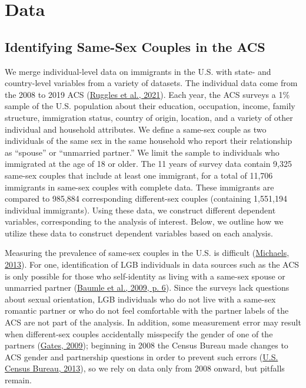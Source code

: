 \documentclass[
  11pt,
]{article}
\begin{document}
\hypertarget{data}{%
\section{Data}\label{data}}

\hypertarget{identifying-same-sex-couples-in-the-acs}{%
\subsection{Identifying Same-Sex Couples in the ACS}\label{identifying-same-sex-couples-in-the-acs}}

We merge individual-level data on immigrants in the U.S. with state- and country-level variables from a variety of datasets. The individual data come from the 2008 to 2019 ACS (\protect\hyperlink{ref-ruggles_2021}{Ruggles et al., 2021}). Each year, the ACS surveys a 1\% sample of the U.S. population about their education, occupation, income, family structure, immigration status, country of origin, location, and a variety of other individual and household attributes. We define a same-sex couple as two individuals of the same sex in the same household who report their relationship as ``spouse'' or ``unmarried partner.'' We limit the sample to individuals who immigrated at the age of 18 or older. The 11 years of survey data contain 9,325 same-sex couples that include at least one immigrant, for a total of 11,706 immigrants in same-sex couples with complete data. These immigrants are compared to 985,884 corresponding different-sex couples (containing 1,551,194 individual immigrants). Using these data, we construct different dependent variables, corresponding to the analysis of interest. Below, we outline how we utilize these data to construct dependent variables based on each analysis.

Measuring the prevalence of same-sex couples in the U.S. is difficult (\protect\hyperlink{ref-michaels_2013}{Michaels, 2013}). For one, identification of LGB individuals in data sources such as the ACS is only possible for those who self-identity as living with a same-sex spouse or unmarried partner (\protect\hyperlink{ref-baumle_2009}{Baumle et al., 2009, p. 6}). Since the surveys lack questions about sexual orientation, LGB individuals who do not live with a same-sex romantic partner or who do not feel comfortable with the partner labels of the ACS are not part of the analysis. In addition, some measurement error may result when different-sex couples accidentally misspecify the gender of one of the partners (\protect\hyperlink{ref-gates_2009a}{Gates, 2009}); beginning in 2008 the Census Bureau made changes to ACS gender and partnership questions in order to prevent such errors (\protect\hyperlink{ref-u.s.censusbureau_2013}{U.S. Census Bureau, 2013}), so we rely on data only from 2008 onward, but pitfalls remain.
\end{document}
